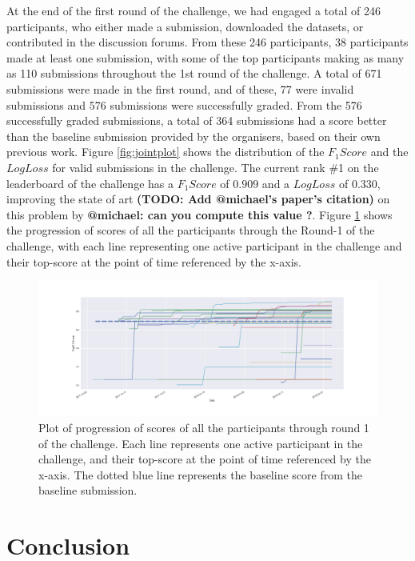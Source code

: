 \documentclass[sigconf]{acmart}
\begin{document}
At the end of the first round of the challenge, we had engaged a total of 246 participants, who either made a submission, downloaded the datasets, or contributed in the discussion forums. From these 246 participants, 38 participants made at least one submission, with some of the top participants making as many as 110 submissions throughout the 1st round of the challenge.
A total of 671 submissions were made in the first round, and of these, 77 were invalid submissions and 576 submissions were successfully graded. 
From the 576 successfully graded submissions, a total of 364 submissions had a score better than the baseline submission provided by the organisers, based on their own previous work. Figure \ref{fig:jointplot} shows the distribution of the $F_1 Score$ and the $Log Loss$ for valid submissions in the challenge.
The current rank \#1 on the leaderboard of the challenge has a $F_1 Score$ of $0.909$ and a $LogLoss$ of $0.330$, improving the state of art \textbf{(TODO: Add @michael's paper's citation)}  on this problem by \textbf{@michael: can you compute this value ?}.
Figure \ref{fig:timeline} shows the progression of scores of all the participants through the Round-1 of the challenge, with each line representing one active participant in the challenge and their top-score at the point of time referenced by the x-axis.

\begin{figure}[h]
\label{fig:timeline}
\includegraphics[width=\linewidth]{images/plot-2}
\caption{ Plot of progression of scores of all the participants through round 1 of the challenge. Each line represents one active participant in the challenge, and their top-score at the point of time referenced by the x-axis. The dotted blue line represents the baseline score from the baseline submission.}
\end{figure}

\section{Conclusion}
\end{document}

